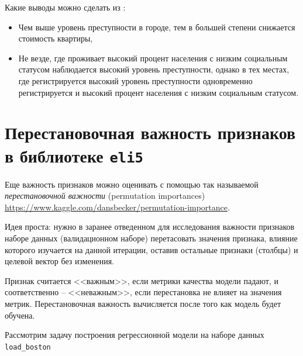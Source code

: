 \documentclass[%
	11pt,
	a4paper,
	utf8,
		]{article}
\begin{document}
Какие выводы можно сделать из :

\begin{itemize}
	\item Чем выше уровень преступности в городе, тем в большей степени снижается стоимость квартиры,
	
	\item Не везде, где проживает высокий процент населения с низким социальным статусом наблюдается высокий уровень преступности, однако в тех местах, где регистрируется высокий уровень преступности одновременно регистрируется и высокий процент населения с низким социальным статусом.
\end{itemize}


\section{Перестановочная важность признаков в библиотеке \texttt{eli5}}


Еще важность признаков можно оценивать с помощью так называемой \emph{перестановочной важности} (permutation importances) \url{https://www.kaggle.com/dansbecker/permutation-importance}.

Идея проста: нужно в заранее отведенном для исследования важности признаков наборе данных (валидационном наборе) перетасовать значения признака, влияние которого изучается на данной итерации, оставив остальные признаки (столбцы) и целевой вектор без изменения.

Признак считается <<важным>>, если метрики качества модели падают, и соответственно -- <<неважным>>, если перестановка не влияет на значения метрик. Перестановочная важность вычисляется после того как модель будет обучена.


Рассмотрим задачу построения регрессионной модели на наборе данных \texttt{load\_boston}
\end{document}
